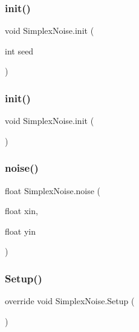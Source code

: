 \subsubsection{\texorpdfstring{init()}{init()}\hspace{0.1cm}{\footnotesize\ttfamily [1/2]}}
{\footnotesize\ttfamily void Simplex\+Noise.\+init (\begin{DoxyParamCaption}\item[{int}]{seed }\end{DoxyParamCaption})}

\mbox{\label{class_simplex_noise_a151aceb21de5c48ab4b5ff7bf82f6b61}} 
\subsubsection{\texorpdfstring{init()}{init()}\hspace{0.1cm}{\footnotesize\ttfamily [2/2]}}
{\footnotesize\ttfamily void Simplex\+Noise.\+init (\begin{DoxyParamCaption}{ }\end{DoxyParamCaption})}

\mbox{\label{class_simplex_noise_a86ab5f95259f74f43d00a00b695d5755}} 
\subsubsection{\texorpdfstring{noise()}{noise()}}
{\footnotesize\ttfamily float Simplex\+Noise.\+noise (\begin{DoxyParamCaption}\item[{float}]{xin,  }\item[{float}]{yin }\end{DoxyParamCaption})}

\mbox{\label{class_simplex_noise_a43164ec5960921789ce75e83651717cf}} 
\subsubsection{\texorpdfstring{Setup()}{Setup()}}
{\footnotesize\ttfamily override void Simplex\+Noise.\+Setup (\begin{DoxyParamCaption}{ }\end{DoxyParamCaption})\hspace{0.3cm}{\ttfamily [virtual]}}



